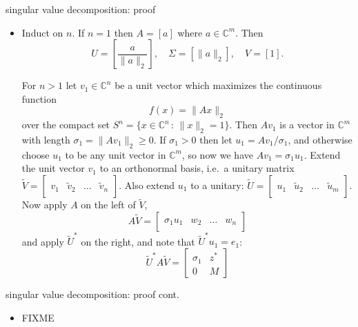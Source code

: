 \documentclass[10pt,hyperref]{beamer}
\newcommand{\CC}{\mathbb{C}}
\newcommand{\trefmatrixthree}[3]{\left[\begin{array}{c|c|c|c} & & & \\ #1 & #2 & \dots & #3 \\ & & & \end{array}\right]}
\newcommand{\blocktwo}[4]{\left[\begin{array}{c|c} #1 & #2 \\ \hline #3 & #4 \end{array}\right]}
\begin{document}
\begin{frame}{singular value decomposition: proof}

\begin{itemize}
\footnotesize
\item[\emph{proof.}] Induct on $n$.  If $n=1$ then $A=[a]$ where $a\in \CC^m$.  Then
  $$U=\left[\frac{a}{\|a\|_2}\right], \quad \Sigma=[\|a\|_2], \quad V=[1].$$

For $n>1$ let $v_1 \in \CC^n$ be a unit vector which maximizes the continuous function
	$$f(x) = \|A x\|_2$$
over the compact set $S^n = \{x\in\CC^n\,:\,\|x\|_2=1\}$.  Then $Av_1$ is a vector in $\CC^m$ with length $\sigma_1=\|Av_1\|_2\ge 0$.  If $\sigma_1>0$ then let $u_1=Av_1/\sigma_1$, and otherwise choose $u_1$ to be any unit vector in $\CC^m$, so now we have $Av_1=\sigma_1 u_1$.  Extend the unit vector $v_1$ to an orthonormal basis, i.e.~a unitary matrix $\tilde V = \trefmatrixthree{v_1}{\tilde v_2}{\tilde v_n}$.  Also extend $u_1$ to a unitary: $\tilde U = \trefmatrixthree{u_1}{\tilde u_2}{\tilde u_m}$.  Now apply $A$ on the left of $\tilde V$,
    $$A\tilde V = \trefmatrixthree{\sigma_1 u_1}{w_2}{w_n}$$
and apply $\tilde U^*$ on the right, and note that $\tilde U^* u_1 = e_1$:
    $$\tilde U^*A\tilde V = \blocktwo{\sigma_1}{z^*}{0}{M}$$
\normalsize
\end{itemize}
\end{frame}


\begin{frame}{singular value decomposition: proof cont.}

\begin{itemize}
\footnotesize
\item[\emph{cont.}] FIXME
\normalsize
\end{itemize}
\end{frame}
\end{document}
